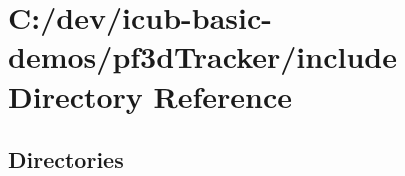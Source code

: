 \section{C\+:/dev/icub-\/basic-\/demos/pf3d\+Tracker/include Directory Reference}
\label{dir_46844ca6f7a7f72255313000c6b6b85e}
\subsection*{Directories}
\begin{DoxyCompactItemize}
\end{DoxyCompactItemize}
